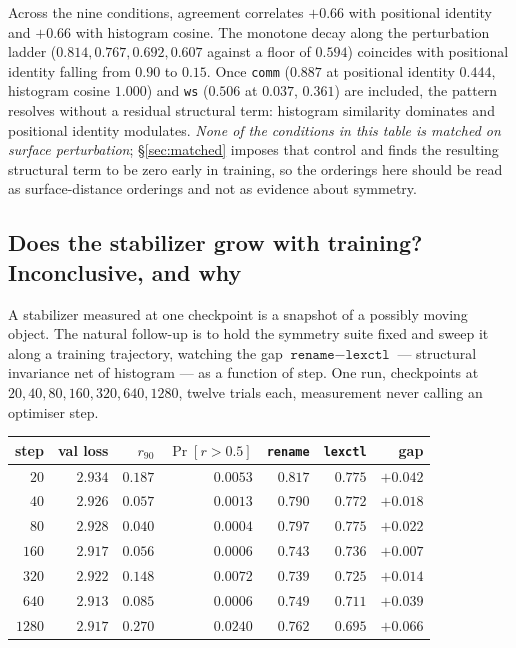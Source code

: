 \begin{observation}
\label{obs:ladder}
Across the nine conditions, agreement correlates $+0.66$ with positional
identity and $+0.66$ with histogram cosine. The monotone decay along the
perturbation ladder ($0.814,0.767,0.692,0.607$ against a floor of $0.594$)
coincides with positional identity falling from $0.90$ to $0.15$. Once
\texttt{comm} ($0.887$ at positional identity $0.444$, histogram cosine
$1.000$) and \texttt{ws} ($0.506$ at $0.037$, $0.361$) are included, the
pattern resolves without a residual structural term: histogram similarity
dominates and positional identity modulates. \emph{None of the conditions in
this table is matched on surface perturbation}; \S\ref{sec:matched} imposes
that control and finds the resulting structural term to be zero early in
training, so the orderings here should be read as surface-distance orderings
and not as evidence about symmetry.
\end{observation}

\subsection{Does the stabilizer grow with training? Inconclusive, and why}
\label{sec:stabilizer-evolution}

A stabilizer measured at one checkpoint is a snapshot of a possibly moving
object. The natural follow-up is to hold the symmetry suite fixed and sweep it
along a training trajectory, watching the gap
$\texttt{rename}-\texttt{lexctl}$ --- structural invariance net of histogram
--- as a function of step. One run, checkpoints at
$20,40,80,160,320,640,1280$, twelve trials each, measurement never calling an
optimiser step.

\begin{center}
\begin{tabular}{rrrrrrr}
\hline
step & val loss & $r_{90}$ & $\Pr[r>0.5]$ & \texttt{rename} & \texttt{lexctl} & gap \\
\hline
$20$   & $2.934$ & $0.187$ & $0.0053$ & $0.817$ & $0.775$ & $+0.042$ \\
$40$   & $2.926$ & $0.057$ & $0.0013$ & $0.790$ & $0.772$ & $+0.018$ \\
$80$   & $2.928$ & $0.040$ & $0.0004$ & $0.797$ & $0.775$ & $+0.022$ \\
$160$  & $2.917$ & $0.056$ & $0.0006$ & $0.743$ & $0.736$ & $+0.007$ \\
$320$  & $2.922$ & $0.148$ & $0.0072$ & $0.739$ & $0.725$ & $+0.014$ \\
$640$  & $2.913$ & $0.085$ & $0.0006$ & $0.749$ & $0.711$ & $+0.039$ \\
$1280$ & $2.917$ & $0.270$ & $0.0240$ & $0.762$ & $0.695$ & $+0.066$ \\
\hline
\end{tabular}
\end{center}

